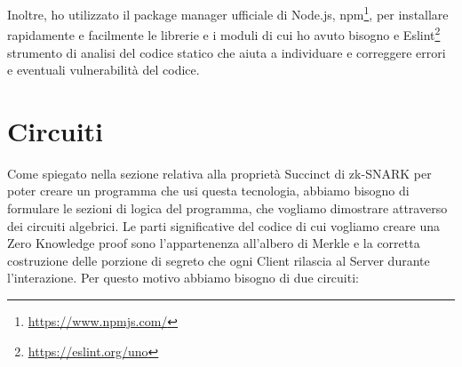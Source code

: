 Inoltre, ho utilizzato il package manager ufficiale di Node.js, npm\footnote{\url{https://www.npmjs.com/}}, per
installare rapidamente e facilmente le librerie e i moduli di cui ho avuto bisogno e
Eslint\footnote{\url{https://eslint.org/uno}}  strumento di analisi del codice statico che aiuta a individuare e
correggere errori e eventuali vulnerabilità del codice.

\section{Circuiti}
Come spiegato nella sezione relativa alla proprietà Succinct di zk-SNARK per poter creare un programma che usi questa
tecnologia, abbiamo bisogno di formulare le sezioni di logica del programma, che vogliamo dimostrare attraverso dei
circuiti algebrici. Le parti significative del codice di cui vogliamo creare una Zero Knowledge proof sono
l'appartenenza  all'albero di Merkle e la corretta costruzione delle porzione di segreto che ogni Client rilascia al
Server durante l'interazione. Per questo motivo abbiamo bisogno di due circuiti:\clearpage
